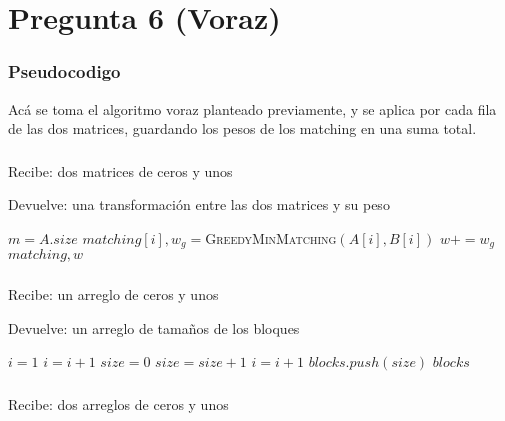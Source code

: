 \section*{Pregunta 6 (Voraz)}
\subsubsection*{Pseudocodigo}

Acá se toma el algoritmo voraz planteado previamente, y se aplica por cada fila de las dos matrices, guardando los pesos de los matching en una suma total.

\subsubsection*{}
Recibe: dos matrices de ceros y unos

Devuelve: una transformación entre las dos matrices y su peso
\begin{algorithmic}[1]
  \STATE $m=A.size$
    \STATE $matching[i],w_g=${\textsc{GreedyMinMatching}$(A[i], B[i])$}
    \STATE $w+=w_g$
  \ENDFOR
  \RETURN $matching,w$
   
\end{algorithmic}

\subsubsection*{}
Recibe: un arreglo de ceros y unos

Devuelve: un arreglo de tamaños de los bloques
\begin{algorithmic}[1]
  \STATE $i = 1$
        \STATE $i = i + 1$
    \ENDWHILE
    \STATE $size = 0$
            \STATE $size = size + 1$
            \STATE $i = i + 1$
        \ENDWHILE
        \STATE $blocks.push(size)$
    \ENDIF
  \ENDWHILE
  \RETURN $blocks$
\end{algorithmic}
\subsubsection*{}
Recibe: dos arreglos de ceros y unos

